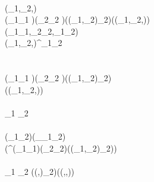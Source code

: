 \begin{hscode}
\\
\>[3]{}(_{1},_{2},)\in \Delta{}\mean{\sigma\to \tau}\mathrel{=}{}\<[E]%
\\
\>[3]{}\<[5]%
\>[5]{}\Pi (_{1}\typcolon{}_1 \mean{\sigma})\hsforall \;(_{2}\typcolon{}_2 \mean{\sigma})\;(\typcolon(_{1},_{2})\in \Delta_2\mean{\sigma})\;(\typcolon(_{1},_{2},)\in \Delta{}\mean{\sigma})\<[E]%
\\
\>[5]{}\<[7]%
\>[7]{}(_{1}\;_{1},_{2}\;_{2},\;_{1}\;_{2}\;)\in \Delta{}\mean{\tau}{}\<[E]%
\\
\>[3]{}(_{1},_{2},)\in \Delta{}\mean{\alpha}\mathrel{=}^\alpha\;_{1}\;_{2}\;\<[E]%
\\[\blanklineskip]%
\>[3]{}\mathrel{=}\<[E]%
\\
\>[3]{}\mathrel{=}{}\<[E]%
\\
\>[3]{}\<[5]%
\>[5]{}\lambda {}\<[8]%
\>[8]{}(_{1}\typcolon{}_1 \mean{\sigma})\;(_{2}\typcolon{}_2 \mean{\sigma})\;(\typcolon(_{1},_{2})\in \Delta_2\mean{\sigma}){}\<[E]%
\\
\>[8]{}(\typcolon(_{1},_{2},)\in \Delta{}\mean{\sigma})\to {}\<[E]%
\\
\>[8]{}\<[E]%
\\
\>[3]{}\mathrel{=}\;_1 \;_2 \;\;\<[E]%
\\
\>[3]{}\mathrel{=}{}\<[E]%
\\
\>[3]{}\<[5]%
\>[5]{}\lambda {}\<[8]%
\>[8]{}(\alpha_{1}\;\alpha_{2}\typcolon\star)\;(\Delta_\alpha\typcolon\alpha_{1}\to \alpha_{2}\to \star){}\<[E]%
\\
\>[8]{}(^\alpha\typcolon\Pi (_{1}\typcolon\alpha_{1})\hsforall \;(_{2}\typcolon\alpha_{2})\;(\typcolon(_{1},_{2})\in \Delta_2\mean{\alpha})\to \lceil \star \rceil)\to {}\<[E]%
\\
\>[8]{}\<[E]%
\\
\>[3]{}\mathrel{=}\;_1 \mean{\tau}\;_2 \mean{\tau}\;((\text{\textendash},\text{\textendash})\in \Delta_2\mean{\tau})\;((\text{\textendash},\text{\textendash},\text{\textendash})\in \Delta{}\mean{\tau}){}\<[E]%
\ColumnHook
\end{hscode}\resethooks
